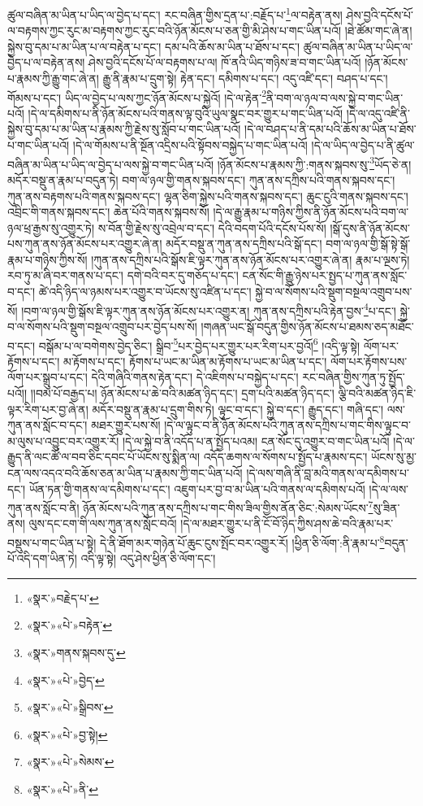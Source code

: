 ཚུལ་བཞིན་མ་ཡིན་པ་ཡིད་ལ་བྱེད་པ་དང་། རང་བཞིན་གྱིས་དྲན་པ་:བརྗོད་པ་\footnote{«སྣར་»བརྗེད་པ་}ལ་བརྟེན་ནས། ཤེས་བྱའི་དངོས་པོ་ལ་བརྟགས་ཀྱང་རུང་མ་བརྟགས་ཀྱང་རུང་བའི་ཉོན་མོངས་པ་ཅན་གྱི་མི་ཤེས་པ་གང་ཡིན་པའོ། །ཐེ་ཚོམ་གང་ཞེ་ན། སྐྱེས་བུ་དམ་པ་མ་ཡིན་པ་ལ་བརྟེན་པ་དང་། དམ་པའི་ཆོས་མ་ཡིན་པ་ཐོས་པ་དང་། ཚུལ་བཞིན་མ་ཡིན་པ་ཡིད་ལ་བྱེད་པ་ལ་བརྟེན་ནས། ཤེས་བྱའི་དངོས་པོ་ལ་བརྟགས་པ་ལ། ཁོ་ནའི་ཡིད་གཉིས་ཟ་བ་གང་ཡིན་པའོ། །ཉོན་མོངས་པ་རྣམས་ཀྱི་རྒྱུ་གང་ཞེ་ན། རྒྱུ་ནི་རྣམ་པ་དྲུག་སྟེ། རྟེན་དང་། དམིགས་པ་དང་། འདུ་འཛི་དང་། བཤད་པ་དང་། གོམས་པ་དང་། ཡིད་ལ་བྱེད་པ་ལས་ཀྱང་ཉོན་མོངས་པ་སྐྱེའོ། །དེ་ལ་རྟེན་\footnote{«སྣར་»«པེ་»བརྟེན་}ནི་བག་ལ་ཉལ་བ་ལས་སྐྱེ་བ་གང་ཡིན་པའོ། །དེ་ལ་དམིགས་པ་ནི་ཉོན་མོངས་པའི་གནས་ལྟ་བུའི་ཡུལ་སྣང་བར་གྱུར་པ་གང་ཡིན་པའོ། །དེ་ལ་འདུ་འཛི་ནི་སྐྱེས་བུ་དམ་པ་མ་ཡིན་པ་རྣམས་ཀྱི་རྗེས་སུ་སློབ་པ་གང་ཡིན་པའོ། །དེ་ལ་བཤད་པ་ནི་དམ་པའི་ཆོས་མ་ཡིན་པ་ཐོས་པ་གང་ཡིན་པའོ། །དེ་ལ་གོམས་པ་ནི་སྔོན་འདྲིས་པའི་སྟོབས་བསྐྱེད་པ་གང་ཡིན་པའོ། །དེ་ལ་ཡིད་ལ་བྱེད་པ་ནི་ཚུལ་བཞིན་མ་ཡིན་པ་ཡིད་ལ་བྱེད་པ་ལས་སྐྱེ་བ་གང་ཡིན་པའོ། །ཉོན་མོངས་པ་རྣམས་ཀྱི་:གནས་སྐབས་སུ་\footnote{«སྣར་»གནས་སྐབས་དུ་}ཡོད་ཅེ་ན། མདོར་བསྡུ་ན་རྣམ་པ་བདུན་ཏེ། བག་ལ་ཉལ་གྱི་གནས་སྐབས་དང་། ཀུན་ནས་དཀྲིས་པའི་གནས་སྐབས་དང་། ཀུན་ནས་བརྟགས་པའི་གནས་སྐབས་དང་། ལྷན་ཅིག་སྐྱེས་པའི་གནས་སྐབས་དང་། ཆུང་ངུའི་གནས་སྐབས་དང་། འབྲིང་གི་གནས་སྐབས་དང་། ཆེན་པོའི་གནས་སྐབས་སོ། །དེ་ལ་རྒྱུ་རྣམ་པ་གཉིས་ཀྱིས་ནི་ཉོན་མོངས་པའི་བག་ལ་ཉལ་ཕྲ་རྒྱས་སུ་འགྱུར་ཏེ། ས་བོན་གྱི་རྗེས་སུ་འབྲེལ་བ་དང་། དེའི་བདག་པོའི་དངོས་པོས་སོ། །སྒོ་དུས་ནི་ཉོན་མོངས་པས་ཀུན་ནས་ཉོན་མོངས་པར་འགྱུར་ཞེ་ན། མདོར་བསྡུ་ན་ཀུན་ནས་དཀྲིས་པའི་སྒོ་དང་། བག་ལ་ཉལ་གྱི་སྒོ་སྟེ་སྒོ་རྣམ་པ་གཉིས་ཀྱིས་སོ། །ཀུན་ནས་དཀྲིས་པའི་སྒོས་ཇི་ལྟར་ཀུན་ནས་ཉོན་མོངས་པར་འགྱུར་ཞེ་ན། རྣམ་པ་ལྔས་ཏེ། རབ་ཏུ་མ་ཞི་བར་གནས་པ་དང་། དགེ་བའི་བར་དུ་གཅོད་པ་དང་། ངན་སོང་གི་རྒྱུ་ཉེས་པར་སྤྱད་པ་ཀུན་ནས་སློང་བ་དང་། ཚེ་འདི་ཉིད་ལ་ཉམས་པར་འགྱུར་བ་ཡོངས་སུ་འཛིན་པ་དང་། སྐྱེ་བ་ལ་སོགས་པའི་སྡུག་བསྔལ་འགྲུབ་པས་སོ། །བག་ལ་ཉལ་གྱི་སྒོས་ཇི་ལྟར་ཀུན་ནས་ཉོན་མོངས་པར་འགྱུར་ན། ཀུན་ནས་དཀྲིས་པའི་རྟེན་བྱས་\footnote{«སྣར་»«པེ་»བྱེད་}པ་དང་། སྐྱེ་བ་ལ་སོགས་པའི་སྡུག་བསྔལ་འགྲུབ་པར་བྱེད་པས་སོ། །གཞན་ཡང་སྒོ་བདུན་གྱིས་ཉོན་མོངས་པ་ཐམས་ཅད་མཐོང་བ་དང་། བསྒོམ་པ་ལ་བགེགས་བྱེད་ཅིང་། སྒྲིབ་\footnote{«སྣར་»«པེ་»སྒྲིབས་}པར་བྱེད་པར་གྱུར་པར་རིག་པར་བྱའོ།\footnote{«སྣར་»«པེ་»བྱ་སྟེ།} །འདི་ལྟ་སྟེ། ལོག་པར་རྟོགས་པ་དང་། མ་རྟོགས་པ་དང་། རྟོགས་པ་ཡང་མ་ཡིན་མ་རྟོགས་པ་ཡང་མ་ཡིན་པ་དང་། ལོག་པར་རྟོགས་པས་ལོག་པར་སྒྲུབ་པ་དང་། དེའི་གཞིའི་གནས་རྟེན་དང་། དེ་འཇིགས་པ་བསྐྱེད་པ་དང་། རང་བཞིན་གྱིས་ཀུན་ཏུ་སྤྱོད་པའོ།། །།བམ་པོ་བརྒྱད་པ། ཉོན་མོངས་པ་ཆེ་བའི་མཚན་ཉིད་དང་། དྲག་པའི་མཚན་ཉིད་དང་། ལྕི་བའི་མཚན་ཉིད་ཇི་ལྟར་རིག་པར་བྱ་ཞེ་ན། མདོར་བསྡུ་ན་རྣམ་པ་དྲུག་གིས་ཏེ། ལྟུང་བ་དང་། སྐྱེ་བ་དང་། རྒྱུད་དང་། གཞི་དང་། ལས་ཀུན་ནས་སློང་བ་དང་། མཐར་གྱུར་པས་སོ། །དེ་ལ་ལྟུང་བ་ནི་ཉོན་མོངས་པའི་ཀུན་ནས་དཀྲིས་པ་གང་གིས་ལྟུང་བ་མ་ལུས་པ་འབྱུང་བར་འགྱུར་རོ། །དེ་ལ་སྐྱེ་བ་ནི་འདོད་པ་ན་སྤྱོད་པའམ། ངན་སོང་དུ་འགྱུར་བ་གང་ཡིན་པའོ། །དེ་ལ་རྒྱུད་ནི་ལང་ཚོ་ལ་བབ་ཅིང་དབང་པོ་ཡོངས་སུ་སྨིན་ལ། འདོད་ཆགས་ལ་སོགས་པ་སྤྱོད་པ་རྣམས་དང་། ཡོངས་སུ་མྱ་ངན་ལས་འདའ་བའི་ཆོས་ཅན་མ་ཡིན་པ་རྣམས་ཀྱི་གང་ཡིན་པའོ། །དེ་ལས་གཞི་ནི་བླ་མའི་གནས་ལ་དམིགས་པ་དང་། ཡོན་ཏན་གྱི་གནས་ལ་དམིགས་པ་དང་། འཇུག་པར་བྱ་བ་མ་ཡིན་པའི་གནས་ལ་དམིགས་པའོ། །དེ་ལ་ལས་ཀུན་ནས་སློང་བ་ནི། ཉོན་མོངས་པའི་ཀུན་ནས་དཀྲིས་པ་གང་གིས་ཟིལ་གྱིས་ནོན་ཅིང་:སེམས་ཡོངས་\footnote{«སྣར་»«པེ་»སེམས་}སུ་ཟིན་ནས། ལུས་དང་ངག་གི་ལས་ཀུན་ནས་སློང་བའོ། །དེ་ལ་མཐར་གྱུར་པ་ནི་ངོ་བོ་ཉིད་ཀྱིས་ཤས་ཆེ་བའི་རྣམ་པར་བསྡུས་པ་གང་ཡིན་པ་སྟེ། དེ་ནི་ཐོག་མར་གཉེན་པོ་ཆུང་ངུས་སྤོང་བར་འགྱུར་རོ། །ཕྱིན་ཅི་ལོག་:ནི་རྣམ་པ་\footnote{«སྣར་»«པེ་»ནི་}བདུན་པོ་འདི་དག་ཡིན་ཏེ། འདི་ལྟ་སྟེ། འདུ་ཤེས་ཕྱིན་ཅི་ལོག་དང་། 